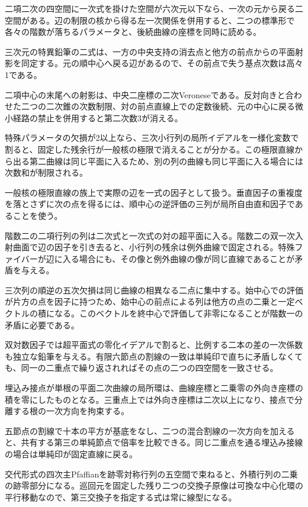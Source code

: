 \documentclass[11pt,a4paper]{ltjsarticle}
\begin{document}
二項二次の四空間に一次式を掛けた空間が六次元以下なら、一次の元から戻る二空間がある。辺の制限の核から得る左一次関係を併用すると、二つの標準形で各々の階数が落ちるパラメータと、後続曲線の座標を同時に読める。

三次元の特異鉛筆の二式は、一方の中央支持の消去点と他方の前点からの平面射影を同定する。元の順中心へ戻る辺があるので、その前点で失う基点次数は高々1である。

二項中心の末尾への射影は、中央二座標の二次Veroneseである。反対向きと合わせた二つの二次錐の次数制限、対の前点直線上での定数後続、元の中心に戻る微小経路の禁止を併用すると第二次数3が消える。

特殊パラメータの欠損が2以上なら、三次小行列の局所イデアルを一様化変数で割ると、固定した残余行が一般核の極限で消えることが分かる。この極限直線から出る第二曲線は同じ平面に入るため、別の列の曲線も同じ平面に入る場合には次数和が制限される。

一般核の極限直線の族上で実際の辺を一式の因子として扱う。垂直因子の重複度を落とさずに次の点を得るには、順中心の逆評価の三列が局所自由直和因子であることを使う。

階数二の二項行列の列は二次式と一次式の対の超平面に入る。階数二の双一次入射曲面で辺の因子を引き去ると、小行列の残余は例外曲線で固定される。特殊ファイバーが辺に入る場合にも、その像と例外曲線の像が同じ直線であることが矛盾を与える。

三次列の順逆の五次欠損は同じ曲線の相異なる二点に集中する。始中心での評価が片方の点を因子に持つため、始中心の前点による列は他方の点の二乗と一定ベクトルの積になる。このベクトルを終中心で評価して非零になることが階数一の矛盾に必要である。

双対数因子では超平面式の零化イデアルで割ると、比例する二本の差の一次係数も独立な鉛筆を与える。有限六節点の割線の一致は単純印で直ちに矛盾しなくても、同一の二重点で繰り返されればその点の二つの四空間を一致させる。

埋込み接点が単根の平面二次曲線の局所環は、曲線座標と二乗零の外向き座標の積を零にしたものとなる。三重点上では外向き座標は二次以上になり、接点で分離する根の一次方向を拘束する。

五節点の割線で十本の平方が基底をなし、二つの混合割線の一次方向を加えると、共有する第三の単純節点で倍率を比較できる。同じ二重点を通る埋込み接線の場合は単純印が固定直線に戻る。

交代形式の四次主Pfaffianを跡零対称行列の五空間で束ねると、外積行列の二乗の跡零部分になる。巡回元を固定した残り二つの交換子原像は可換な中心化環の平行移動なので、第三交換子を指定する式は常に線型になる。
\end{document}
